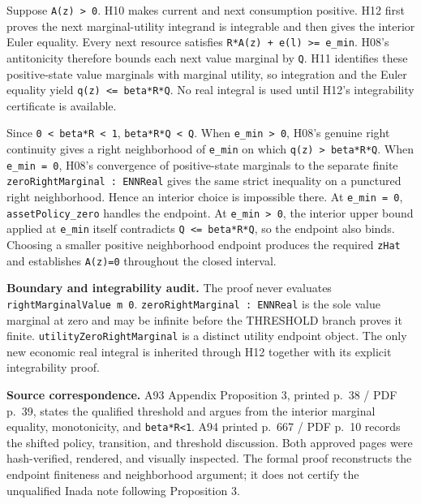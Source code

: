\documentclass[
  11pt,
]{article}
\let\LedgerOriginalTexttt\texttt
\renewcommand{\texttt}[1]{{\small\LedgerOriginalTexttt{#1}}}
\begin{document}
Suppose \texttt{A(z)\ \textgreater{}\ 0}. H10 makes current and next
consumption positive. H12 first proves the next marginal-utility
integrand is integrable and then gives the interior Euler equality.
Every next resource satisfies
\texttt{R*A(z)\ +\ e(l)\ \textgreater{}=\ e\_min}. H08's antitonicity
therefore bounds each next value marginal by \texttt{Q}. H11 identifies
these positive-state value marginals with marginal utility, so
integration and the Euler equality yield
\texttt{q(z)\ \textless{}=\ beta*R*Q}. No real integral is used until
H12's integrability certificate is available.

Since \texttt{0\ \textless{}\ beta*R\ \textless{}\ 1},
\texttt{beta*R*Q\ \textless{}\ Q}. When
\texttt{e\_min\ \textgreater{}\ 0}, H08's genuine right continuity gives
a right neighborhood of \texttt{e\_min} on which
\texttt{q(z)\ \textgreater{}\ beta*R*Q}. When \texttt{e\_min\ =\ 0},
H08's convergence of positive-state marginals to the separate finite
\texttt{zeroRightMarginal\ :\ ENNReal} gives the same strict inequality
on a punctured right neighborhood. Hence an interior choice is
impossible there. At \texttt{e\_min\ =\ 0}, \texttt{assetPolicy\_zero}
handles the endpoint. At \texttt{e\_min\ \textgreater{}\ 0}, the
interior upper bound applied at \texttt{e\_min} itself contradicts
\texttt{Q\ \textless{}=\ beta*R*Q}, so the endpoint also binds. Choosing
a smaller positive neighborhood endpoint produces the required
\texttt{zHat} and establishes \texttt{A(z)=0} throughout the closed
interval.

\textbf{Boundary and integrability audit.} The proof never evaluates
\texttt{rightMarginalValue\ m\ 0}.
\texttt{zeroRightMarginal\ :\ ENNReal} is the sole value marginal at
zero and may be infinite before the THRESHOLD branch proves it finite.
\texttt{utilityZeroRightMarginal} is a distinct utility endpoint object.
The only new economic real integral is inherited through H12 together
with its explicit integrability proof.

\textbf{Source correspondence.} A93 Appendix Proposition 3, printed
p.~38 / PDF p.~39, states the qualified threshold and argues from the
interior marginal equality, monotonicity, and
\texttt{beta*R\textless{}1}. A94 printed p.~667 / PDF p.~10 records the
shifted policy, transition, and threshold discussion. Both approved
pages were hash-verified, rendered, and visually inspected. The formal
proof reconstructs the endpoint finiteness and neighborhood argument; it
does not certify the unqualified Inada note following Proposition 3.
\end{document}
